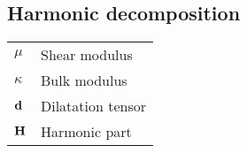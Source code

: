 {        \subsection*{Harmonic decomposition}
        \label{sec:hamronic_decomposition}
        \vspace{-1em}
        \begin{longtable}{p{} p{}}
            \( \mu \)               & Shear modulus                                                                         \\[0.5em]
            \( \kappa \)            & Bulk modulus                                                                          \\[0.5em]
            \( \mathbf{d} \)              & Dilatation tensor                                                                     \\[0.5em]
            \( \mathbf{H} \)              & Harmonic part                                                                         \\[0.5em]
        \end{longtable}
}
